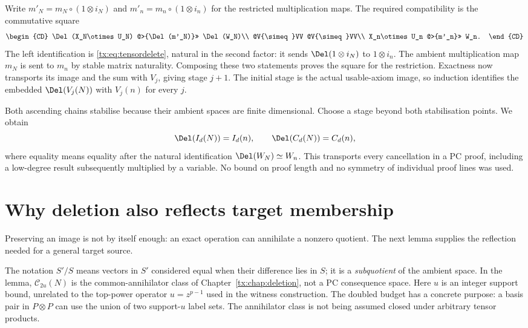 \documentclass[11pt,a4paper,oneside,openany]{book}
\theoremstyle{definition}\newtheorem{definition}[theorem]{Definition}
\theoremstyle{remark}\newtheorem{remark}[theorem]{Remark}
\numberwithin{equation}{chapter}
\begin{document}
Write $m'_N=m_N\circ(1\otimes i_N)$ and
$m'_n=m_n\circ(1\otimes i_n)$ for the restricted multiplication
maps. The required compatibility is the commutative square
\begin{equation}\label{tx:eq:restricted-multiplication}
\begin{CD}
 \Del(X_N\otimes U_N) @>{\Del(m'_N)}>> \Del(W_N)\\
 @V{\simeq}VV @V{\simeq}VV\\
 X_n\otimes U_n @>{m'_n}>> W_n.
\end{CD}
\end{equation}
The left identification is \eqref{tx:eq:tensordelete}, natural in
the second factor: it sends $\Del(1\otimes i_N)$ to
$1\otimes i_n$. The ambient multiplication map $m_N$ is sent to
$m_n$ by stable matrix naturality. Composing these two statements
proves the square for the restriction. Exactness now transports its
image and the sum with $V_j$, giving stage $j+1$. The initial stage
is the actual usable-axiom image, so induction identifies the embedded
$\Del(V_j(N))$ with $V_j(n)$ for every $j$.

Both ascending chains stabilise because their ambient spaces are finite
dimensional. Choose a stage beyond both stabilisation points. We obtain
\begin{equation}\label{tx:eq:consequence-transport}
 \Del(I_d(N))=I_d(n),\qquad \Del(C_d(N))=C_d(n),
\end{equation}
where equality means equality after the natural identification
$\Del(W_N)\simeq W_n$. This transports every cancellation in a PC
proof, including a low-degree result subsequently multiplied by a
variable. No bound on proof length and no symmetry of individual proof
lines was used.

\section{Why deletion also reflects target membership}
Preserving an image is not by itself enough: an exact operation can
annihilate a nonzero quotient. The next lemma supplies the reflection
needed for a general target source.

The notation $S'/S$ means vectors in $S'$ considered equal when their
difference lies in $S$; it is a \emph{subquotient} of the ambient space.
In the lemma, $\mathcal C_{2u}(N)$ is the common-annihilator class of
Chapter~\ref{tx:chap:deletion}, not a PC consequence space.
Here $u$ is an integer support bound, unrelated to the top-power
operator $u=z^{p-1}$ used in the witness construction.
The doubled budget has a concrete purpose: a basis pair in
$P\otimes P$ can use the union of two support-$u$ label sets.
The annihilator class is not being assumed closed under arbitrary
tensor products.
\end{document}
